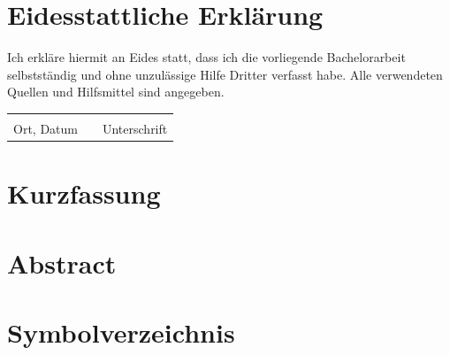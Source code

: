 \documentclass[12pt, a4paper, openright]{report}
\begin{document}
	
	

	
	\chapter*{Eidesstattliche Erklärung}
	Ich erkläre hiermit an Eides statt, dass ich die vorliegende Bachelorarbeit selbstständig und ohne unzulässige Hilfe Dritter verfasst habe. Alle verwendeten Quellen und Hilfsmittel sind angegeben.
	
	\vspace{3cm}
	\noindent
	\begin{tabular}{@{}p{5cm}p{2cm}p{5cm}@{}}
		\hrulefill & & \hrulefill \\
		Ort, Datum & & Unterschrift
	\end{tabular}
	
	\cleardoublepage
	
	\chapter*{Kurzfassung}
	
	\cleardoublepage
	
	\chapter*{Abstract}
	
	\cleardoublepage
	
	\tableofcontents
	\cleardoublepage
	
	
	
	\chapter*{Symbolverzeichnis}
	\cleardoublepage
	
\end{document}
